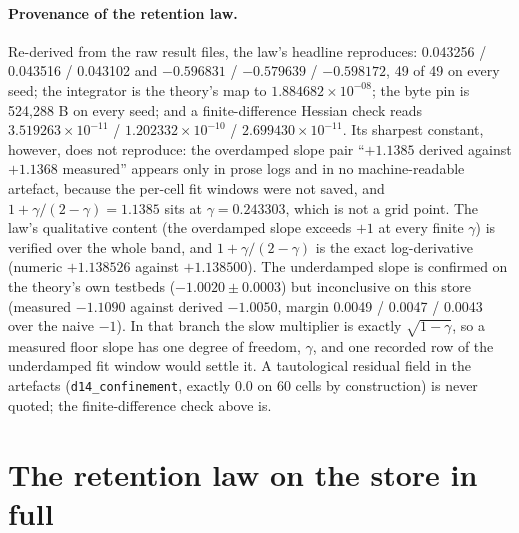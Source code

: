 \documentclass{article} %
\newcommand{\sci}[2]{\ensuremath{#1\times10^{#2}}}
\begin{document}
\paragraph{Provenance of the retention law.} Re-derived from the raw result files, the law's
headline reproduces: 0.043256 / 0.043516 / 0.043102 and $-0.596831$ / $-0.579639$ / $-0.598172$,
49 of 49 on every seed; the integrator is the theory's map to \sci{1.884682}{-08}; the byte pin is
524,288 B on every seed; and a finite-difference Hessian check reads \sci{3.519263}{-11} /
\sci{1.202332}{-10} / \sci{2.699430}{-11}. %
Its sharpest constant, however, does not reproduce: the overdamped slope pair ``$+1.1385$ derived
against $+1.1368$ measured'' appears only in prose logs and in no machine-readable artefact,
because the per-cell fit windows were not saved, and $1+\gamma/(2-\gamma)=1.1385$ sits at
$\gamma=0.243303$, which is not a grid point. The law's qualitative content (the overdamped slope
exceeds $+1$ at every finite $\gamma$) is verified over the whole band, and $1+\gamma/(2-\gamma)$ is
the exact log-derivative (numeric $+1.138526$ against $+1.138500$). The underdamped slope is
confirmed on the theory's own testbeds ($-1.0020\pm0.0003$) but inconclusive on this store (measured
$-1.1090$ against derived $-1.0050$, margin 0.0049 / 0.0047 / 0.0043 over the naive $-1$). In that
branch the slow multiplier is exactly $\sqrt{1-\gamma}$, so a measured floor slope has one degree of
freedom, $\gamma$, and one recorded row of the underdamped fit window would settle it. A tautological
residual field in the artefacts (\texttt{d14\_confinement}, exactly 0.0 on 60 cells by construction)
is never quoted; the finite-difference check above is. %

\section{The retention law on the store in full}
\label{app:physics}
\end{document}
